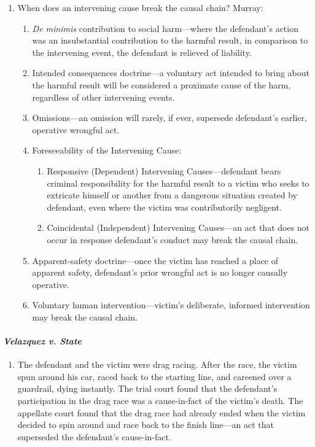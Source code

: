 \begin{enumerate}
    \item When does an intervening cause break the causal chain? Murray:
    \begin{enumerate}
        \item \emph{De minimis} contribution to social harm---where the defendant's action was an insubstantial contribution to the harmful result, in comparison to the intervening event, the defendant is relieved of liability.
        \item Intended consequences doctrine---a voluntary act intended to bring about the harmful result will be considered a proximate cause of the harm, regardless of other intervening events.
        \item Omissions---an omission will rarely, if ever, supersede defendant's earlier, operative wrongful act.
        \item Foreseeability of the Intervening Cause:
        \begin{enumerate}
            \item Responsive (Dependent) Intervening Causes---defendant bears criminal responsibility for the harmful result to a victim who seeks to extricate himself or another from a dangerous situation created by defendant, even where the victim was contributorily negligent.
            \item Coincidental (Independent) Intervening Causes---an act that does not occur in response defendant's conduct may break the causal chain.
        \end{enumerate}
        \item Apparent-safety doctrine---once the victim has reached a place of apparent safety, defendant's prior wrongful act is no longer causally operative.
        \item Voluntary human intervention---victim's deliberate, informed intervention may break the causal chain.
    \end{enumerate}
\end{enumerate}

\paragraph{\emph{Velazquez v. State}}

\begin{enumerate}
    \item The defendant and the victim were drag racing. After the race, the victim spun around his car, raced back to the starting line, and careened over a guardrail, dying instantly. The trial court found that the defendant's participation in the drag race was a cause-in-fact of the victim's death. The appellate court found that the drag race had already ended when the victim decided to spin around and race back to the finish line---an act that superseded the defendant's cause-in-fact.
\end{enumerate}
